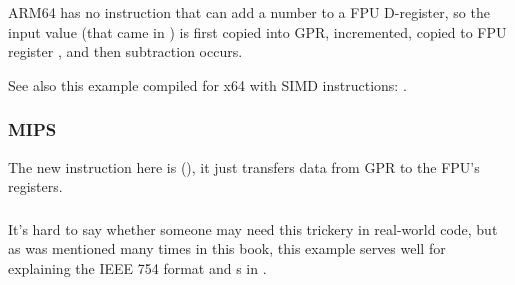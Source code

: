 

ARM64 has no instruction that can add a number to a FPU D-register, 
so the input value (that came in ) is first copied into \ac{GPR},
incremented, copied to FPU register , and then subtraction occurs.



See also this example compiled for x64 with SIMD instructions: .

\subsubsection{MIPS}


The new instruction here is  (), it just transfers data from \ac{GPR} to the FPU's registers.



\subsubsection{\Conclusion}

It's hard to say whether someone may need this trickery in real-world code, 
but as was mentioned many times in this book, this example serves well 
for explaining the IEEE 754 format and s in \CCpp.

